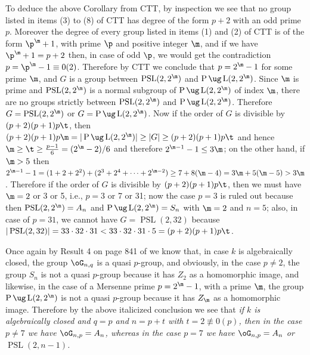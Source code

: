 To deduce 
the above Corollary 
from CTT, by inspection we see that no group listed in 
items (3) to (8) of CTT has degree of the form $p+2$ with 
an odd
prime $p$. Moreover the degree of every group listed in 
items (1) and (2)
of CTT is of the form $\p^{\m}+1$, with prime $\p$ and 
positive integer $\m$,
and if we have  $\p^{\m}+1=p+2$ then, in case of odd $\p$, 
we would get
the contradiction $p=\p^{\m}-1 \equiv 0(2)$.  Therefore 
by CTT we conclude that $p=2^{\m}-1$ for
some prime $\m$, and $G$ is a group between 
$\operatorname{PSL}(2,2^{\m})$ and 
$\operatorname{P} \ug \operatorname{L}(2,2^{\m})$. Since 
$\m$ is prime and $\operatorname{PSL}(2,2^{\m})$ is a 
normal
subgroup of 
$\operatorname{P}\ug\operatorname{L}(2,2^{\m})$ of index 
$\m$, there are no groups
strictly between $\operatorname{PSL}(2,2^{\m})$ and 
$\operatorname{P} \ug \operatorname{L}(2,2^{\m})$. 
Therefore $G=\operatorname{PSL}(2,2^{\m})$ or 
$G=\operatorname{P}\ug\operatorname{L}(2,2^{\m})$. 
Now if the order of $G$ is divisible by $(p+2)(p+1)p\t$, 
then
$(p+2)(p+
1)p\m=|\operatorname{P}\ug\operatorname{L}(2,2^{\m})|\ge 
|G|\ge(p+2)(p+1)p\t$ and hence
$\m\ge\t\ge\frac{p-1}{6}=(2^{\m}-2)/6$ and therefore 
$2^{\m-1}-1\le 3\m$;
on the other hand, if $\m>5$ then 
$2^{\m-1}-1=(1+2+2^2)+(2^3+2^4+\dots+2^{\m-2})\ge 7+
8(\m-4)=3\m+5(\m-5)>3\m$.
Therefore if the order of $G$ is divisible by $(p+2)(p+
1)p\t$, then we must
have $\m=2$ or 3 or 5, i.e., $p=3$ or 7 or 31; now the 
case $p=3$ is ruled 
out because then $\operatorname{PSL}(2,2^{\m})=A_n$ and 
$\operatorname{P}\ug\operatorname{L}(2,2^{\m})=S_n$ with
$\m=2$ and $n=5$; also, in case of $p=31$, we cannot have 
$G=\operatorname{PSL}(2,32)$
because 
$|\operatorname{PSL}(2,32)|=33\cdot 32\cdot 31<33\cdot 
32\cdot 31\cdot 5=(p+2)(p+1)p\t$.  

Once again 
by Result 4 on page 841 of \cite{A3} we know that, in case 
$k$ is algebraically
closed, the group $\oG_{n,q}$ is a quasi $p$-group, and 
obviously, in the case
$p\ne 2$, the group $S_n$ is not a quasi $p$-group because 
it has $Z_2$ 
as a homomorphic image, and likewise, in the case of a 
Mersenne prime
$p=2^{\m}-1$, with a prime $\m$, the group 
$\operatorname{P}\ug\operatorname{L}(2,2^{\m})$ is not a
quasi $p$-group because it has $Z_{\m}$ as a homomorphic 
image.
Therefore by the above italicized conclusion we see that 
{\it
if $k$ is algebraically closed and $q=p$ and $n=p+t$ with 
$t=2\not\equiv 0(p)$, then in the case $p\ne 7$ we have 
$\oG_{n,p}=A_n$,
whereas in the case $p=7$ we have
$\oG_{n,p}=A_n$ or $\operatorname{PSL}(2,n-1)$.}

